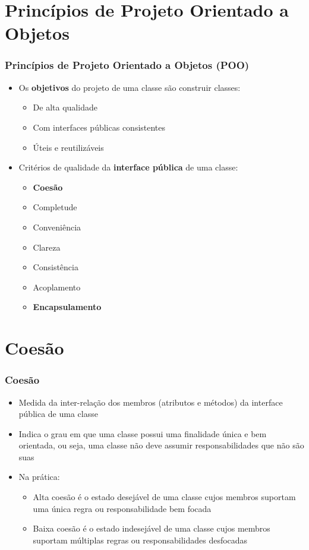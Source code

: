 \documentclass[aspectratio=169]{beamer}
\begin{document}
\section{Princípios de Projeto Orientado a Objetos}

\begin{frame}\frametitle{Princípios de Projeto Orientado a Objetos (POO)}
\begin{itemize}
	\item Os \textbf{objetivos} do projeto de uma classe são construir classes:
	\begin{itemize}
		\item De alta qualidade
		\item Com interfaces públicas consistentes
		\item Úteis e reutilizáveis
	\end{itemize}
	\item Critérios de qualidade da \textbf{interface pública} de uma classe:
	\begin{itemize}
		\item \textbf{Coesão}
		\item Completude
		\item Conveniência
		\item Clareza
		\item Consistência
		\item Acoplamento
		\item \textbf{Encapsulamento}
	\end{itemize}
\end{itemize}
\end{frame}

\section{Coesão}

\begin{frame}\frametitle{Coesão}
\begin{itemize}
	\item Medida da inter-relação dos membros (atributos e métodos) da interface pública de uma classe
	\item Indica o grau em que uma classe possui uma finalidade única e bem orientada, ou seja, uma classe não deve assumir responsabilidades que não são suas
	\item Na prática:
	\begin{itemize}
		\item Alta coesão é o estado desejável de uma classe cujos membros suportam uma única regra ou responsabilidade bem focada
		\item Baixa coesão é o estado indesejável de uma classe cujos membros suportam múltiplas regras ou responsabilidades desfocadas
	\end{itemize}
\end{itemize}
\end{frame}
\end{document}
